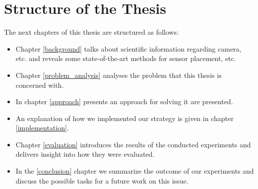 \section{Structure of the Thesis}



The next chapters of this thesis are structured as follows: 
\begin{itemize}
    \item Chapter \ref{background} talks about scientific information regarding camera, etc. and reveals some state-of-the-art methods for sensor placement, etc.
    \item Chapter \ref{problem_analysis} analyses the problem that this thesis is concerned with.
    \item In chapter \ref{approach} presents an approach for solving it are presented.
    \item An explanation of how we implemented our strategy is given in chapter \ref{implementation}.
    \item Chapter \ref{evaluation} introduces the results of the conducted experiments and delivers insight into how they were evaluated.
    \item In the \ref{conclusion} chapter we summarize the outcome of our experiments and discuss the possible tasks for a future work on this issue.
\end{itemize} 
